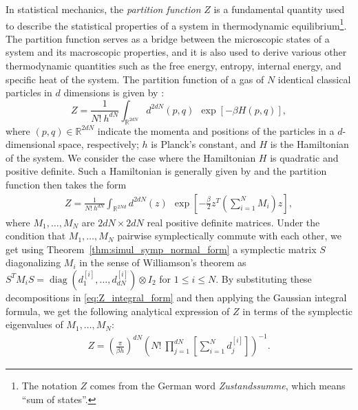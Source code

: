 \documentclass[preprint,12pt]{elsarticle}
\begin{document}
   In statistical mechanics, the \textit{partition function} $Z$ is a fundamental quantity used to describe the statistical properties of a system in thermodynamic equilibrium\footnote{The notation $Z$ comes from the German word \emph{Zustandssumme}, which means ``sum of states''.}. 
   The partition function serves as a bridge between the microscopic states of a system and its macroscopic properties, and it is also used to derive various other thermodynamic quantities such as the free energy, entropy, internal energy, and specific heat of the system.
    The partition function of a gas of $N$ identical classical particles in $d$ dimensions is given by \cite[Chapter~7]{Huang1967}:
    \begin{equation}
        Z=\frac{1}{N! \ h^{dN}} \int_{\mathds{R}^{2dN}}\! d^{2dN}(p,q) \ \ \exp\left[-\beta H(p, q) \right],
    \end{equation}
    where $(p,q) \in \mathds{R}^{2dN}$ indicate the momenta and positions of the particles in a $d$-dimensional space, respectively; $h$ is Planck's constant, and $H$ is the Hamiltonian of the system.
    We consider the case where the Hamiltonian $H$ is quadratic and positive definite. Such a Hamiltonian is generally given by \cite[Eq.~1]{Härkönen_2022}
    and the partition function then takes the form
    \begin{align}\label{eq:Z_integral_form}
        Z=\frac{1}{N!\ h^{dN}} \int_{\mathds{R}^{2Nd}}\! d^{2dN}(z) \ \   \exp\left[ - \frac{\beta}{2}z^{T} \left(\sum_{{i=1}}^{{N}} M_{i} \right)z \right],
    \end{align}
    where $M_1,\ldots, M_N$ are $2dN \times 2dN$ real positive definite matrices.
    Under the condition that $M_1,\ldots, M_N$ pairwise symplectically commute with each other, we get using Theorem~\ref{thm:simul_symp_normal_form} a symplectic matrix $S$ diagonalizing $M_i$ in the sense of Williamson's theorem as $S^T M_i S= \operatorname{diag}(d^{[i]}_{1},\ldots, d^{[i]}_{dN}) \otimes I_2$ for $1 \leq i \leq N$.
    By substituting these decompositions in \eqref{eq:Z_integral_form} and then applying the  Gaussian integral formula, we get the following analytical expression of $Z$ in terms of the symplectic eigenvalues of $M_1,\ldots, M_N$:
    \begin{align}
        Z 
        = \left(\frac{\pi}{\beta h} \right)^{dN} \left(N! \  \prod_{j=1}^{dN}  \left[ \sum_{i=1}^{N} d^{[i]}_j \right] \right)^{-1}.
    \end{align}
\end{document}
